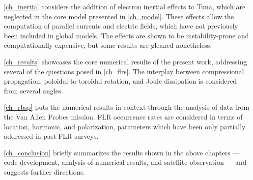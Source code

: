 \cref{ch_inertia} considers the addition of electron inertial effects to Tuna,
which are neglected in the core model presented in \cref{ch_model}. These
effects allow the computation of parallel currents and electric fields, which
have not previously been included in global \Alfven models. The effects are
shown to be instability-prone and computationally expensive, but some results
are gleaned nonetheless. 

\cref{ch_results} showcases the core numerical results of the present work,
addressing several of the questions posed in \cref{ch_flrs}. The interplay
between compressional propagation, poloidal-to-toroidal rotation, and Joule
dissipation is considered from several angles. 

\cref{ch_rbsp} puts the numerical results in context through the analysis of
data from the Van Allen Probes mission. FLR occurrence rates are considered in
terms of location, harmonic, and polarization, parameters which have been only
partially addressed in past FLR surveys. 

\cref{ch_conclusion} briefly summarizes the results shown in the above chapters
--- code development, analysis of numerical results, and satellite observation
--- and suggests further directions. 





